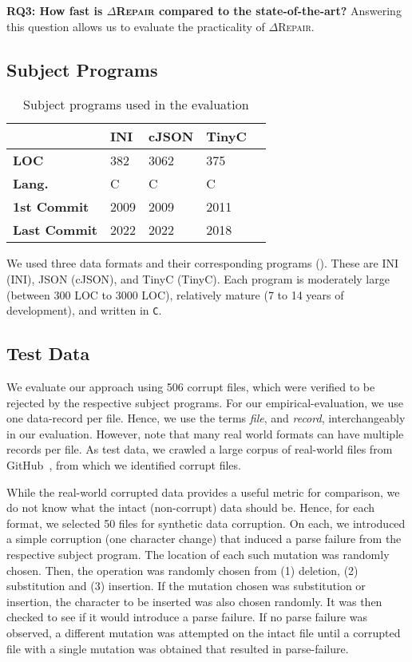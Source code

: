 \documentclass[acmsmall,screen,review,anonymous]{acmart}
\newcommand{\approach}{\textsc{$\Delta$Repair}\xspace}
\newcommand{\drepair}{\approach}
\def\<#1>{\texttt{#1}}
\begin{document}
\noindent\textbf{RQ3: How fast is \drepair compared to the state-of-the-art?}
Answering this question allows us to evaluate the practicality of \drepair.


\subsection{Subject Programs} %
\begin{table}[!tbp]\centering
\caption{Subject programs used in the evaluation}
\begin{tabular}{|p{4cm}|p{2cm}|p{2cm}|p{2cm}|p{2cm}|}
\hline
\textbf{} & \textbf{INI} & \textbf{cJSON} & \textbf{TinyC} \\
\hline
\textbf{LOC} & 382 & 3062 & 375\\
\textbf{Lang.} & C & C & C \\
\textbf{1st Commit} & 2009 & 2009 & 2011\\
\textbf{Last Commit} & 2022 & 2022 & 2018\\
\hline
\end{tabular}
\label{tab:subjectprograms}
\end{table}

We used three data formats and their corresponding programs (). These are INI (INI), JSON (cJSON), and TinyC (TinyC). Each program is moderately large (between 300 LOC to 3000 LOC), relatively mature (7 to 14 years of development), and written in \<C>.

\subsection{Test Data} 

We evaluate our approach using 506 corrupt files, which were verified to be
rejected by the respective subject programs.
For our empirical-evaluation, we use one data-record per file. Hence, we use
the terms \emph{file}, and \emph{record}, interchangeably in our evaluation.
However, note that many real world formats can have multiple records per file.
As test data, we crawled a large corpus of real-world files
from GitHub~\cite{githubapi}, from which we identified corrupt files. 

While the real-world corrupted data provides a useful metric for comparison,
we do not know what the intact (non-corrupt) data should be. Hence,
for each format, we selected 50 files for synthetic data corruption. On each,
we introduced a simple corruption (one character change) that induced a
parse failure from the respective subject program. The location of each 
such mutation was randomly chosen. Then, the operation was randomly chosen
from (1) deletion, (2) substitution and (3) insertion. If the mutation
chosen was substitution or insertion, the character to be inserted was
also chosen randomly. It was then checked to see if it would introduce
a parse failure. If no parse failure was observed, a different mutation
was attempted on the intact file until a corrupted file with a single
mutation was obtained that resulted in parse-failure.
\end{document}
